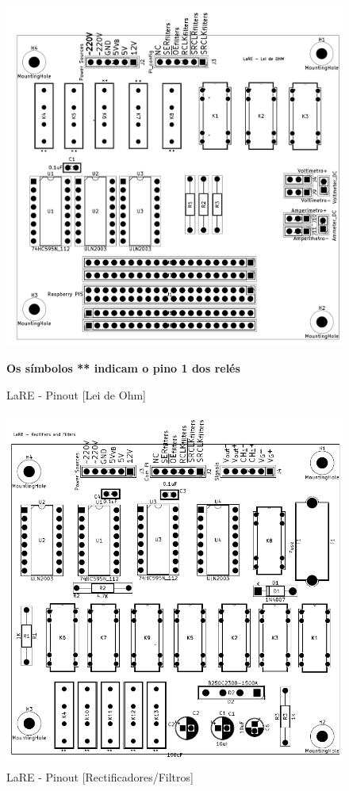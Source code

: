 \documentclass[a4paper,oneside,final,twocolumn]{article}
\begin{document}
\begin{figure}[hbtp]
    \centering
    \includegraphics[width=1\textwidth]{lei_ohm_PB.png}
    \caption{LaRE - Pinout [Lei de Ohm]}
    \label{fig:placaleiohm}
    \textbf{Os símbolos ** indicam o pino 1 dos relés}
\end{figure}
\centering

\begin{figure}[hbtp]
    \centering
    \includegraphics[width=1\textwidth]{rectificador_DATASHEET.png}
    \caption{LaRE - Pinout [Rectificadores/Filtros]}
    \label{fig:rectificadoresfiltros}
\end{figure}
\centering
\raggedright
\end{document}
